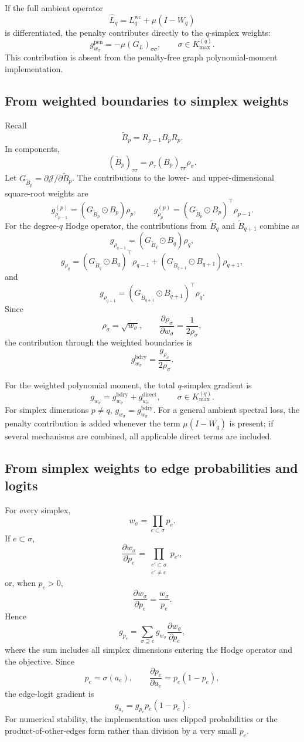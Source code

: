 \documentclass[pdflatex,sn-mathphys-num]{sn-jnl}%
\theoremstyle{thmstyleone}%
\theoremstyle{thmstyletwo}%
\theoremstyle{thmstylethree}%
\begin{document}
\begin{appendices}
If the full ambient operator
\[
\widehat L_q
=
L_q^{\mathrm{wc}}
+
\mu(I-W_q)
\]
is differentiated, the penalty contributes directly to the \(q\)-simplex weights:
\[
g_{w_\sigma}^{\mathrm{pen}}
=
-\mu(G_L)_{\sigma\sigma},
\qquad
\sigma\in K_{\max}^{(q)}.
\]
This contribution is absent from the penalty-free graph polynomial-moment implementation.

\subsection{From weighted boundaries to simplex weights}

Recall
\[
\widetilde B_p
=
R_{p-1}B_pR_p.
\]
In components,
\[
(\widetilde B_p)_{\tau\sigma}
=
\rho_\tau(B_p)_{\tau\sigma}\rho_\sigma.
\]
Let
\(G_{\widetilde B_p}
=
\partial\mathcal J/\partial\widetilde B_p\).
The contributions to the lower- and upper-dimensional square-root weights are
\[
g_{\rho_{p-1}}^{(p)}
=
(G_{\widetilde B_p}\odot B_p)\rho_p,
\qquad
g_{\rho_p}^{(p)}
=
(G_{\widetilde B_p}\odot B_p)^\top\rho_{p-1}.
\]
For the degree-\(q\) Hodge operator, the contributions from
\(\widetilde B_q\) and \(\widetilde B_{q+1}\) combine as
\[
g_{\rho_{q-1}}
=
(G_{\widetilde B_q}\odot B_q)\rho_q,
\]
\[
g_{\rho_q}
=
(G_{\widetilde B_q}\odot B_q)^\top\rho_{q-1}
+
(G_{\widetilde B_{q+1}}\odot B_{q+1})\rho_{q+1},
\]
and
\[
g_{\rho_{q+1}}
=
(G_{\widetilde B_{q+1}}\odot B_{q+1})^\top\rho_q.
\]
Since
\[
\rho_\sigma=\sqrt{w_\sigma},
\qquad
\frac{\partial\rho_\sigma}{\partial w_\sigma}
=
\frac1{2\rho_\sigma},
\]
the contribution through the weighted boundaries is
\[
g_{w_\sigma}^{\mathrm{bdry}}
=
\frac{g_{\rho_\sigma}}{2\rho_\sigma}.
\]

For the weighted polynomial moment, the total \(q\)-simplex gradient is
\[
g_{w_\sigma}
=
g_{w_\sigma}^{\mathrm{bdry}}
+
g_{w_\sigma}^{\mathrm{direct}},
\qquad
\sigma\in K_{\max}^{(q)}.
\]
For simplex dimensions \(p\neq q\),
\(g_{w_\sigma}=g_{w_\sigma}^{\mathrm{bdry}}\).
For a general ambient spectral loss, the penalty contribution is added whenever the term \(\mu(I-W_q)\) is present; if several mechanisms are combined, all applicable direct terms are included.

\subsection{From simplex weights to edge probabilities and logits}

For every simplex,
\[
w_\sigma
=
\prod_{e\subset\sigma}p_e.
\]
If \(e\subset\sigma\),
\[
\frac{\partial w_\sigma}{\partial p_e}
=
\prod_{\substack{e'\subset\sigma\\e'\neq e}}p_{e'},
\]
or, when \(p_e>0\),
\[
\frac{\partial w_\sigma}{\partial p_e}
=
\frac{w_\sigma}{p_e}.
\]
Hence
\[
g_{p_e}
=
\sum_{\sigma\supseteq e}
g_{w_\sigma}
\frac{\partial w_\sigma}{\partial p_e},
\]
where the sum includes all simplex dimensions entering the Hodge operator and the objective. Since
\[
p_e=\sigma(a_e),
\qquad
\frac{\partial p_e}{\partial a_e}
=
p_e(1-p_e),
\]
the edge-logit gradient is
\[
g_{a_e}
=
g_{p_e}p_e(1-p_e).
\]
For numerical stability, the implementation uses clipped probabilities or the product-of-other-edges form rather than division by a very small \(p_e\).


\end{appendices}
\end{document}
